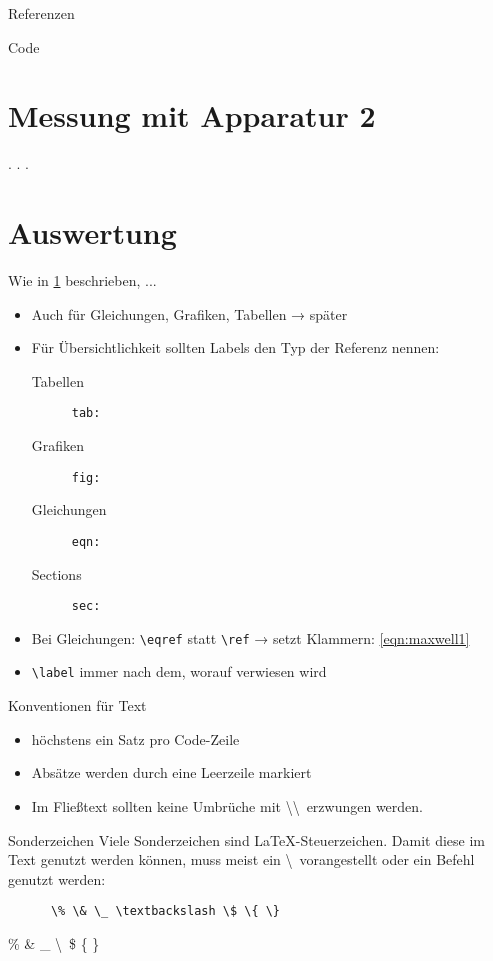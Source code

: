 \begin{frame}[fragile]{Referenzen}
  \begin{block}{Code}
    \begin{lstverbatim}
    \section{Messung mit Apparatur 2}
    \label{sec:apparatur2}
    . . .
    \section{Auswertung}
    Wie in \ref{sec:apparatur2} beschrieben, ...
    \end{lstverbatim}
  \end{block}
  \begin{itemize}
    \item Auch für Gleichungen, Grafiken, Tabellen → später
    \item Für Übersichtlichkeit sollten Labels den Typ der Referenz nennen:
      \begin{description}
        \item[Tabellen] \texttt{tab:}
        \item[Grafiken] \texttt{fig:}
        \item[Gleichungen] \texttt{eqn:}
        \item[Sections] \texttt{sec:}
      \end{description}
    \item Bei Gleichungen: \verb+\eqref+ statt \verb+\ref+ → setzt Klammern: \eqref{eqn:maxwell1}
    \item \verb+\label+ immer nach dem, worauf verwiesen wird
  \end{itemize}
\end{frame}

\begin{frame}[fragile]{Konventionen für Text}
  \begin{itemize}
    \item höchstens ein Satz pro Code-Zeile
    \item Absätze werden durch eine Leerzeile markiert
    \item Im Fließtext sollten keine Umbrüche mit \textbackslash\textbackslash\ erzwungen werden.
  \end{itemize}
  \begin{alertblock}{Sonderzeichen}
    Viele Sonderzeichen sind \LaTeX-Steuerzeichen.
    Damit diese im Text genutzt werden können, muss meist ein \textbackslash\ vorangestellt oder ein Befehl genutzt werden:
    \begin{center}
      \begin{lstlisting}
      \% \& \_ \textbackslash \$ \{ \}
      \end{lstlisting}
      \% \& \_ \textbackslash\ \$ \{ \}
    \end{center}
  \end{alertblock}
\end{frame}

